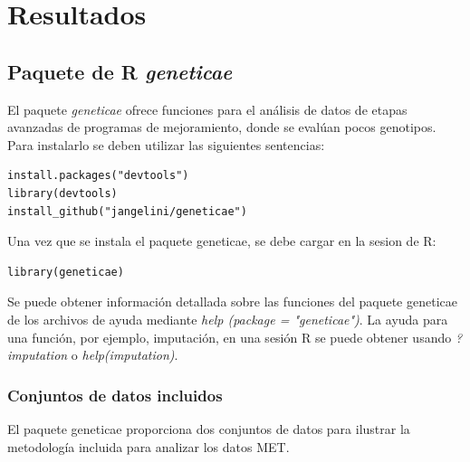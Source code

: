 \chapter{Resultados}
\section{Paquete de R \emph{geneticae}}

El paquete \emph{geneticae} ofrece funciones para el análisis de datos de etapas avanzadas de programas de mejoramiento, donde se evalúan pocos genotipos. Para instalarlo se deben utilizar las siguientes sentencias:

\begin{lstlisting}
install.packages("devtools")
library(devtools)
install_github("jangelini/geneticae")
\end{lstlisting}

Una vez que se instala el paquete geneticae, se debe cargar en la sesion de R:

\begin{lstlisting}
library(geneticae)
\end{lstlisting}


Se puede obtener información detallada sobre las funciones del paquete geneticae de los archivos de ayuda mediante \emph{help (package = "geneticae")}.  La ayuda para una función, por ejemplo, imputación, en una sesión R se puede obtener usando \emph{?imputation} o \emph{help(imputation)}.


\subsection{Conjuntos de datos incluidos}

El paquete geneticae proporciona dos conjuntos de datos para ilustrar la metodología incluida para analizar los datos MET.

